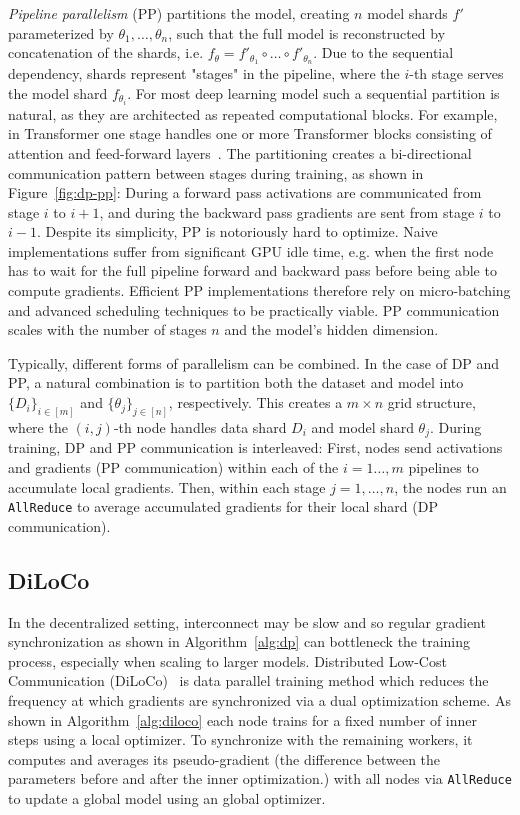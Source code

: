 \documentclass{article}
\begin{document}
\textit{Pipeline parallelism} (PP) partitions the model, creating $n$ model
shards $f'$ parameterized by $\theta_1,\dots,\theta_n$, such that the full model
is reconstructed by concatenation of the shards, i.e.
$f_{\theta}=f'_{\theta_1}\circ\dots\circ f'_{\theta_n}$. Due to the sequential
dependency, shards represent "stages" in the pipeline, where the $i$-th stage
serves the model shard $f_{\theta_i}$. For most deep learning model such a
sequential partition is natural, as they are architected as repeated
computational blocks. For example, in Transformer one stage handles one or more
Transformer blocks consisting of attention and feed-forward
layers~\cite{vaswani2017transformer}. The partitioning creates a bi-directional
communication pattern between stages during training, as shown in
Figure~\ref{fig:dp-pp}: During a forward pass activations are communicated from
stage $i$ to $i+1$, and during the backward pass gradients are sent from stage
$i$ to $i-1$. Despite its simplicity, PP is notoriously hard to optimize. Naive
implementations suffer from significant GPU idle time, e.g. when the first node
has to wait for the full pipeline forward and backward pass before being able to
compute gradients. Efficient PP implementations therefore rely on micro-batching
and advanced scheduling techniques to be practically viable. PP communication
scales with the number of stages $n$ and the model's hidden dimension.

Typically, different forms of parallelism can be combined. In the case of DP and
PP, a natural combination is to partition both the dataset and model into
$\{D_i\}_{i\in [m]}$ and $\{\theta_j\}_{j\in [n]}$, respectively. This creates a
$m\times n$ grid structure, where the $(i,j)$-th node handles data shard $D_i$
and model shard $\theta_j$. During training, DP and PP communication is
interleaved: First, nodes send activations and gradients (PP communication)
within each of the $i=1\dots,m$ pipelines to accumulate local gradients. Then,
within each stage $j=1,\dots,n$, the nodes run an \texttt{AllReduce} to average
accumulated gradients for their local shard (DP communication).

\subsection{DiLoCo}

In the decentralized setting, interconnect may be slow and so regular gradient
synchronization as shown in Algorithm~\ref{alg:dp} can bottleneck the training
process, especially when scaling to larger models. Distributed Low-Cost
Communication (DiLoCo)~\cite{douillard2023diloco} is data parallel training method
which reduces the frequency at which gradients are synchronized via a dual
optimization scheme. As shown in Algorithm~\ref{alg:diloco} each node trains for
a fixed number of inner steps using a local optimizer. To synchronize with the
remaining workers, it computes and averages its pseudo-gradient (the difference
between the parameters before and after the inner optimization.) with all nodes
via \texttt{AllReduce} to update a global model using an global optimizer. 
\end{document}
